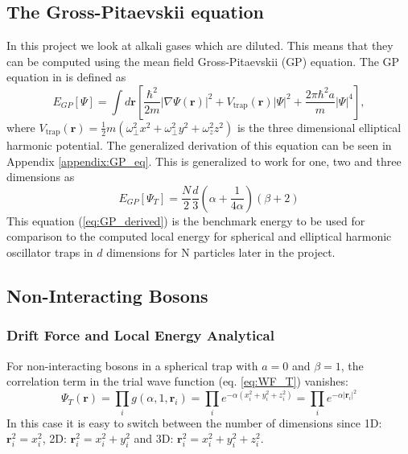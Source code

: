 \documentclass[12pt,a4paper,english]{article}
\begin{document}
\subsection{The Gross-Pitaevskii equation}
\label{subsect:GP_eq}
In this project we look at alkali gases which are diluted. This means that they can be computed using the mean field Gross-Pitaevskii (GP) equation. The GP equation in \citet{dubois2001bose} is defined as
\begin{equation}
\label{eq:GP_eq}
E_{GP}[\Psi]=\int d\textbf{r}\left[\frac{\hbar^2}{2m}|\nabla\Psi(\textbf{r})|^2+V_{\text{trap}}(\textbf{r})|\Psi|^2+\frac{2\pi\hbar^2a}{m}|\Psi|^4\right],
\end{equation}
where $V_{\text{trap}}(\textbf{r})=\frac{1}{2}m(\omega_{\perp}^2x^2+\omega_{\perp}^2y^2+\omega_z^2z^2)$ is the three dimensional elliptical harmonic potential. The generalized derivation of this equation can be seen in Appendix \ref{appendix:GP_eq}. This is generalized to work for one, two and three dimensions as
\begin{equation}
\label{eq:GP_derived}
E_{GP}[\Psi_T]=\frac{N}{2}\frac{d}{3}\left(\alpha+\frac{1}{4\alpha}\right)(\beta+2)
\end{equation}
This equation (\ref{eq:GP_derived}) is the benchmark energy to be used for comparison to the computed local energy for spherical and elliptical harmonic oscillator traps in $d$ dimensions for N particles later in the project.

\subsection{Non-Interacting Bosons}
\label{subsect:non-int}
\subsubsection{Drift Force and Local Energy Analytical}
\label{subsubsect:EL_analytic}
For non-interacting bosons in a spherical trap with $a=0$ and $\beta=1$, the correlation term in the trial wave function (eq. \ref{eq:WF_T}) vanishes:
\begin{equation}
\label{eq:nonint_WF_T}
\Psi_T(\textbf{r})=\prod_i g(\alpha,1,\mathbf{r}_i)=\prod_{i}e^{-\alpha(x_i^2+y_i^2+z_i^2)}=\prod_{i}e^{-\alpha|\textbf{r}_i|^2}
\end{equation}
In this case it is easy to switch between the number of dimensions since 1D: $\textbf{r}_i^2=x_i^2$, 2D: $\textbf{r}_i^2=x_i^2+y_i^2$ and 3D: $\textbf{r}_i^2=x_i^2+y_i^2+z_i^2$.
\end{document}
